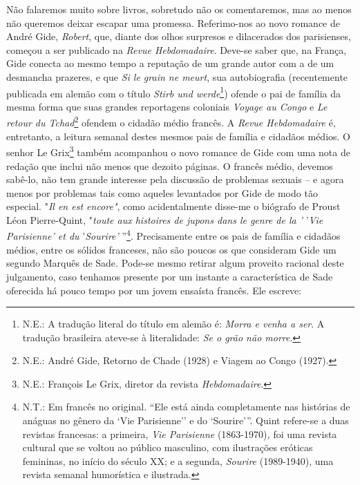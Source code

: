 Não falaremos muito sobre livros, sobretudo não os comentaremos, mas ao
menos não queremos deixar escapar uma promessa. Referimo-nos ao novo
romance de André Gide, \emph{Robert}, que, diante dos olhos surpresos e
dilacerados dos parisienses, começou a ser publicado na \emph{Revue
Hebdomadaire}. Deve-se saber que, na França, Gide conecta ao mesmo tempo
a reputação de um grande autor com a de um desmancha prazeres, e que
\emph{Si le grain ne meurt}, sua autobiografia (recentemente publicada
em alemão com o título \emph{Stirb und werde}\footnote{N.E.: A tradução
  literal do título em alemão é: \emph{Morra e venha a ser}. A tradução
  brasileira ateve-se à literalidade: \emph{Se o grão não morre}.})
ofende o pai de família da mesma forma que suas grandes reportagens
coloniais \emph{Voyage au Congo} e \emph{Le retour du Tchad}\footnote{N.E.:
  André Gide, Retorno de Chade (1928) e Viagem ao Congo (1927).} ofendem
o cidadão médio francês. A \emph{Revue Hebdomadaire} é, entretanto, a
leitura semanal destes mesmos pais de família e cidadãos médios. O
senhor Le Grix\footnote{N.E.: ‎François Le Grix, diretor da revista
  \emph{Hebdomadaire}.} também acompanhou o novo romance de Gide com uma
nota de redação que inclui não menos que dezoito páginas. O francês
médio, devemos sabê-lo, não tem grande interesse pela discussão de
problemas sexuais -- e agora menos por problemas tais como aqueles
levantados por Gide de modo tão especial. "\emph{Il en est encore"},
como acidentalmente disse-me o biógrafo de Proust Léon Pierre-Quint,
"\emph{toute aux histoires de jupons dans le genre de la '} '\emph{Vie
Parisienne' et du} '\emph{Sourire'} ''\footnote{N.T.: Em francês no
  original. ``Ele está ainda completamente nas histórias de anáguas no
  gênero da `Vie Parisienne'' e do `Sourire'''. Quint refere-se a duas
  revistas francesas: a primeira, \emph{Vie Parisienne}
  (1863-1970)\emph{,} foi uma revista cultural que se voltou ao público
  masculino, com ilustrações eróticas femininas, no início do século XX;
  e a segunda, \emph{Sourire} (1989-1940), uma revista semanal
  humorística e ilustrada.}. Precisamente entre os pais de família e
cidadãos médios, entre os sólidos franceses, não são poucos os que
consideram Gide um segundo Marquês de Sade. Pode-se mesmo retirar algum
proveito racional deste julgamento, caso tenhamos presente por um
instante a característica de Sade oferecida há pouco tempo por um jovem
ensaísta francês. Ele escreve:

